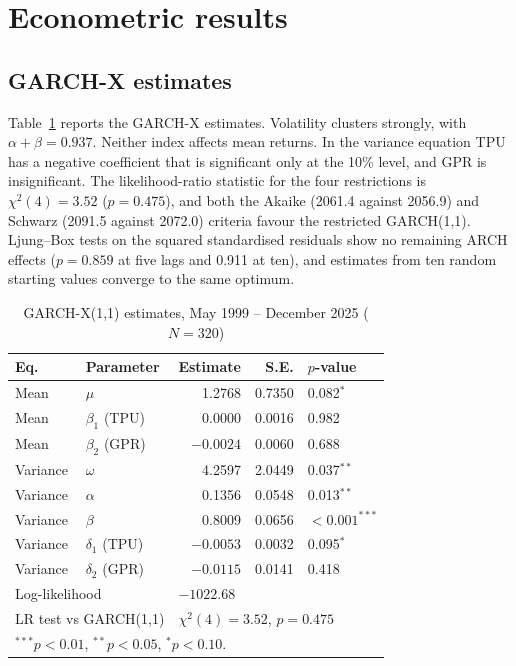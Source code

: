 \documentclass[10pt,twocolumn,a4paper]{article}
\begin{document}
\section{Econometric results}\label{sec:results}

\subsection{GARCH-X estimates}

Table~\ref{tab:garch} reports the GARCH-X estimates. Volatility clusters strongly, with $\alpha+\beta=0.937$. Neither index affects mean returns. In the variance equation TPU has a negative coefficient that is significant only at the 10\% level, and GPR is insignificant. The likelihood-ratio statistic for the four restrictions is $\chi^2(4)=3.52$ ($p=0.475$), and both the Akaike (2061.4 against 2056.9) and Schwarz (2091.5 against 2072.0) criteria favour the restricted GARCH(1,1). Ljung--Box tests on the squared standardised residuals show no remaining ARCH effects ($p=0.859$ at five lags and 0.911 at ten), and estimates from ten random starting values converge to the same optimum.

\begin{table}[htbp]\centering\footnotesize
\caption{GARCH-X(1,1) estimates, May 1999 -- December 2025 ($N=320$)}\label{tab:garch}
\setlength{\tabcolsep}{3.5pt}
\begin{tabular}{llrrl}
\toprule
Eq. & Parameter & Estimate & S.E. & $p$-value \\
\midrule
Mean & $\mu$ & 1.2768 & 0.7350 & 0.082$^{*}$ \\
Mean & $\beta_1$ (TPU) & 0.0000 & 0.0016 & 0.982 \\
Mean & $\beta_2$ (GPR) & $-0.0024$ & 0.0060 & 0.688 \\
Variance & $\omega$ & 4.2597 & 2.0449 & 0.037$^{**}$ \\
Variance & $\alpha$ & 0.1356 & 0.0548 & 0.013$^{**}$ \\
Variance & $\beta$ & 0.8009 & 0.0656 & $<0.001^{***}$ \\
Variance & $\delta_1$ (TPU) & $-0.0053$ & 0.0032 & 0.095$^{*}$ \\
Variance & $\delta_2$ (GPR) & $-0.0115$ & 0.0141 & 0.418 \\
\midrule
\multicolumn{2}{l}{Log-likelihood} & \multicolumn{3}{l}{$-1022.68$} \\
\multicolumn{2}{l}{LR test vs GARCH(1,1)} & \multicolumn{3}{l}{$\chi^2(4)=3.52$, $p=0.475$} \\
\bottomrule
\multicolumn{5}{l}{\footnotesize $^{***}p<0.01$, $^{**}p<0.05$, $^{*}p<0.10$.}
\end{tabular}
\end{table}
\end{document}
